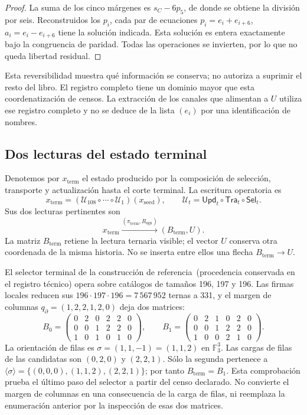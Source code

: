 \begin{proof}
La suma de los cinco márgenes es \(s_C-6p_5\), de donde se obtiene la
división por seis. Reconstruidos los \(p_i\), cada par de ecuaciones
\(p_i=e_i+e_{i+6}\), \(a_i=e_i-e_{i+6}\) tiene la solución indicada.
Esta solución es entera exactamente bajo la congruencia de paridad. Todas
las operaciones se invierten, por lo que no queda libertad residual.
\end{proof}

Esta reversibilidad muestra qué información se conserva; no autoriza a
suprimir el resto del libro. El registro completo tiene un dominio mayor
que esta coordenatización de censos. La extracción de los canales que alimentan a
\(U\) utiliza ese registro completo y no se deduce de la lista
\((e_i)\) por una identificación de nombres.

\subsection{Dos lecturas del estado terminal}
\label{subsec:k-terminal}

Denotemos por \(x_{\mathrm{term}}\) el estado producido por la composición
de selección, transporte y actualización hasta el corte terminal. La
escritura operatoria es
\[
 x_{\mathrm{term}}=
 (\mathcal U_{108}\circ\cdots\circ\mathcal U_1)(x_{\mathrm{seed}}),
 \qquad \mathcal U_t=\mathsf{Upd}_t\circ\mathsf{Tra}_t\circ\mathsf{Sel}_t.
\]
Sus dos lecturas pertinentes son
\[
 x_{\mathrm{term}}
 \xrightarrow{(\pi_{\mathrm{term}},R_{\mathrm{sgn}})}
 (B_{\mathrm{term}},U).
\]
La matriz \(B_{\mathrm{term}}\) retiene la lectura ternaria visible; el
vector \(U\) conserva otra coordenada de la misma historia. No se inserta
entre ellos una flecha \(B_{\mathrm{term}}\to U\).

El selector terminal de la construcción de referencia~\textup{(procedencia conservada en el registro técnico)} opera sobre catálogos
de tamaños 196, 197 y 196. Las firmas locales reducen sus
\(196\cdot197\cdot196=7\,567\,952\) ternas a 331, y el margen de
columnas \(q_{\partial}=(1,2,2,1,2,0)\) deja dos matrices:
\[
 B_0=\begin{pmatrix}0&2&0&2&2&0\\0&0&1&2&2&0\\1&0&1&0&1&0\end{pmatrix},
 \qquad
 B_1=\begin{pmatrix}0&2&1&0&2&0\\0&0&1&2&2&0\\1&0&0&2&1&0\end{pmatrix}.
\]
La orientación de filas es \(\sigma=(1,1,-1)=(1,1,2)\) en
\(\mathbb F_3^3\). Las cargas de filas de las candidatas son
\((0,2,0)\) y \((2,2,1)\). Sólo la segunda pertenece a
\(\langle\sigma\rangle=\{(0,0,0),(1,1,2),(2,2,1)\}\); por tanto
\(B_{\mathrm{term}}=B_1\). Esta comprobación prueba el último paso del
selector a partir del censo declarado. No convierte el margen de columnas
en una consecuencia de la carga de filas, ni reemplaza la enumeración
anterior por la inspección de esas dos matrices.

